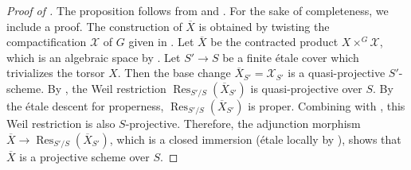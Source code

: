 \documentclass[11pt, reqno]{amsart}
\theoremstyle{plain}
\theoremstyle{definition}
\DeclareMathOperator{\Res}{Res}
\begin{document}
\begin{proof}[Proof of ]
    The proposition follows from  and \cite[Proposition 6.2.4]{CKproblemtorsors}.
    For the sake of completeness, we include a proof. The construction of $\overline{X}$ is obtained by twisting the compactification $\mathcal{X}$ of $G$ given in . Let $\overline{X}$ be the contracted product $X\times^{G}\mathcal{X}$, which is an algebraic space by \cite[06PH]{stacks-project}. Let $S'\rightarrow S$ be a finite étale cover which trivializes the torsor $X$. Then the base change $\overline{X}_{S'}=\mathcal{X}_{S'}$ is a quasi-projective $S'$-scheme. By \cite[Proposition~A.5.8 and its proof]{CGP}, the Weil restriction $\Res_{S'/S}(\overline{X}_{S'})$ is quasi-projective over $S$. By the étale descent for properness, $\Res_{S'/S}(\overline{X}_{S'})$ is proper. Combining with \cite[remarques~5.5.4(i)]{EGA2}, this Weil restriction is also $S$-projective. Therefore, the adjunction morphism $\overline{X}\rightarrow \Res_{S'/S}(\overline{X}_{S'})$, which is a closed immersion (étale locally by \cite[Proposition~A.5.7]{CGP}), shows that $\overline{X}$ is a projective scheme over $S$.
    

\end{proof}
\end{document}
